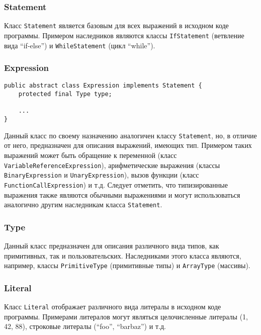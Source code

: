 \subsubsection{Statement}

Класс \texttt{Statement} является базовым для всех выражений в исходном коде
программы. Примером наследников являются классы \texttt{IfStatement} (ветвление
вида ``if-else'') и \texttt{WhileStatement} (цикл ``while'').

\subsubsection{Expression}

\begin{lstlisting}[caption={Класс Expression}]
public abstract class Expression implements Statement {
    protected final Type type;

    ...
}
\end{lstlisting}

Данный класс по своему назначению аналогичен классу \texttt{Statement}, но, в
отличие от него, предназначен для описания выражений, имеющих тип. Примером
таких выражений может быть обращение к переменной (класс
\texttt{VariableReferenceExpression}), арифметические выражения (классы
\texttt{BinaryExpression} и \texttt{UnaryExpression}), вызов функции (класс
\texttt{FunctionCallExpression}) и т.д. Следует отметить, что типизированные
выражения также являются обычными выражениями и могут использоваться аналогично
другим наследникам класса \texttt{Statement}.

\vspace{10pt}
\subsubsection{Type}

Данный класс предназначен для описания различного вида типов, как примитивных,
так и пользовательских. Наследниками этого класса являются, например, классы
\texttt{PrimitiveType} (примитивные типы) и \texttt{ArrayType} (массивы).

\subsubsection{Literal}

Класс \texttt{Literal} отображает различного вида литералы в исходном коде
программы. Примерами литералов могут являться целочисленные литералы (1, 42, 88),
строковые литералы (``foo'', ``barbaz'') и т.д.

